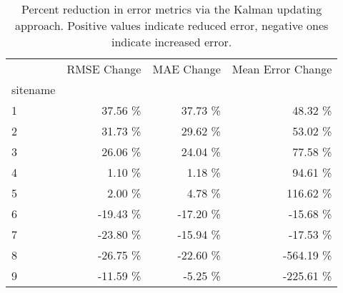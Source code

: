 \begin{table}[htbp]
\centering
\caption{Percent reduction in error metrics via the Kalman updating approach. Positive values indicate reduced error, negative ones indicate increased error.}
\label{tab:oahu-percent-change}
\begin{tabular}{lrrr}
\toprule
 & RMSE Change & MAE Change & Mean Error Change \\
sitename &  &  &  \\
\midrule
1 & 37.56 \% & 37.73 \% & 48.32 \% \\
2 & 31.73 \% & 29.62 \% & 53.02 \% \\
3 & 26.06 \% & 24.04 \% & 77.58 \% \\
4 & 1.10 \% & 1.18 \% & 94.61 \% \\
5 & 2.00 \% & 4.78 \% & 116.62 \% \\
6 & -19.43 \% & -17.20 \% & -15.68 \% \\
7 & -23.80 \% & -15.94 \% & -17.53 \% \\
8 & -26.75 \% & -22.60 \% & -564.19 \% \\
9 & -11.59 \% & -5.25 \% & -225.61 \% \\
\bottomrule
\end{tabular}
\end{table}
